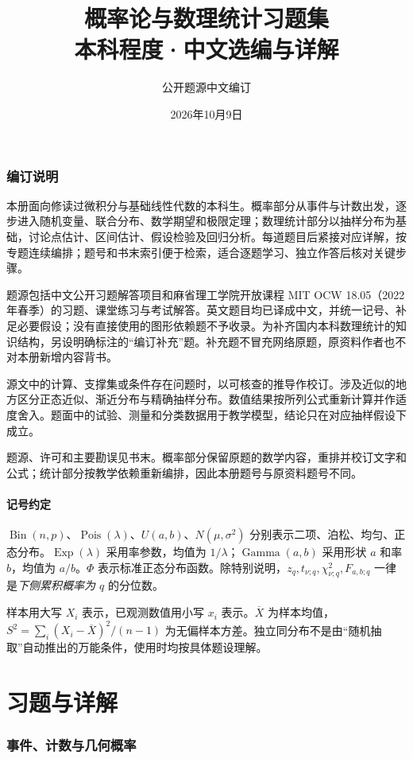 \documentclass[12pt,fontset=fandol]{ctexart}
\title{概率论与数理统计习题集\\\large 本科程度·中文选编与详解}
\author{公开题源中文编订}
\date{2026年10月9日}
\begin{document}
\maketitle
\thispagestyle{empty}
\clearpage
\section*{编订说明}
本册面向修读过微积分与基础线性代数的本科生。概率部分从事件与计数出发，逐步进入随机变量、联合分布、数学期望和极限定理；数理统计部分以抽样分布为基础，讨论点估计、区间估计、假设检验及回归分析。每道题目后紧接对应详解，按专题连续编排；题号和书末索引便于检索，适合逐题学习、独立作答后核对关键步骤。

题源包括中文公开习题解答项目和麻省理工学院开放课程 MIT OCW 18.05（2022 年春季）的习题、课堂练习与考试解答。英文题目均已译成中文，并统一记号、补足必要假设；没有直接使用的图形依赖题不予收录。为补齐国内本科数理统计的知识结构，另设明确标注的“编订补充”题。补充题不冒充网络原题，原资料作者也不对本册新增内容背书。

源文中的计算、支撑集或条件存在问题时，以可核查的推导作校订。涉及近似的地方区分正态近似、渐近分布与精确抽样分布。数值结果按所列公式重新计算并作适度舍入。题面中的试验、测量和分类数据用于教学模型，结论只在对应抽样假设下成立。

题源、许可和主要勘误见书末。概率部分保留原题的数学内容，重排并校订文字和公式；统计部分按教学依赖重新编排，因此本册题号与原资料题号不同。
\subsection*{记号约定}
$\operatorname{Bin}(n,p)$、$\operatorname{Pois}(\lambda)$、$U(a,b)$、$N(\mu,\sigma^2)$ 分别表示二项、泊松、均匀、正态分布。$\operatorname{Exp}(\lambda)$ 采用率参数，均值为 $1/\lambda$；$\operatorname{Gamma}(a,b)$ 采用形状 $a$ 和率 $b$，均值为 $a/b$。$\Phi$ 表示标准正态分布函数。除特别说明，$z_q,t_{\nu;q},\chi^2_{\nu;q},F_{a,b;q}$ 一律是\emph{下侧累积概率为 $q$} 的分位数。

样本用大写 $X_i$ 表示，已观测数值用小写 $x_i$ 表示。$\overline X$ 为样本均值，$S^2=\sum_i(X_i-\overline X)^2/(n-1)$ 为无偏样本方差。独立同分布不是由“随机抽取”自动推出的万能条件，使用时均按具体题设理解。
\clearpage
\tableofcontents
\clearpage
\part{习题与详解}


\clearpage\section{事件、计数与几何概率}
\end{document}
